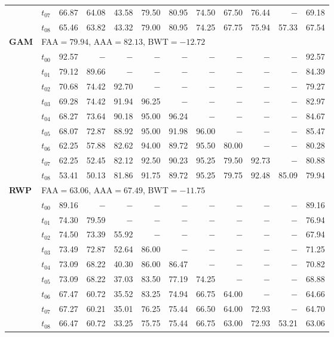 \begin{table}[ht]
\begin{tabular}{@{}l l r r r r r r r r r r@{}}
 & $t_{07}$ & 66.87 & 64.08 & 43.58 & 79.50 & 80.95 & 74.50 & 67.50 & 76.44 & $-$ & 69.18 \\
 & $t_{08}$ & 65.46 & 63.82 & 43.32 & 79.00 & 80.95 & 74.25 & 67.75 & 75.94 & 57.33 & 67.54 \\
\midrule
\multirow{10}{*}{\textbf{GAM}} & \multicolumn{11}{l}{\quad\small FAA$=79.94$,\; AAA$=82.13$,\; BWT$=-12.72$} \\
 & $t_{00}$ & 92.57 & $-$ & $-$ & $-$ & $-$ & $-$ & $-$ & $-$ & $-$ & 92.57 \\
 & $t_{01}$ & 79.12 & 89.66 & $-$ & $-$ & $-$ & $-$ & $-$ & $-$ & $-$ & 84.39 \\
 & $t_{02}$ & 70.68 & 74.42 & 92.70 & $-$ & $-$ & $-$ & $-$ & $-$ & $-$ & 79.27 \\
 & $t_{03}$ & 69.28 & 74.42 & 91.94 & 96.25 & $-$ & $-$ & $-$ & $-$ & $-$ & 82.97 \\
 & $t_{04}$ & 68.27 & 73.64 & 90.18 & 95.00 & 96.24 & $-$ & $-$ & $-$ & $-$ & 84.67 \\
 & $t_{05}$ & 68.07 & 72.87 & 88.92 & 95.00 & 91.98 & 96.00 & $-$ & $-$ & $-$ & 85.47 \\
 & $t_{06}$ & 62.25 & 57.88 & 82.62 & 94.00 & 89.72 & 95.50 & 80.00 & $-$ & $-$ & 80.28 \\
 & $t_{07}$ & 62.25 & 52.45 & 82.12 & 92.50 & 90.23 & 95.25 & 79.50 & 92.73 & $-$ & 80.88 \\
 & $t_{08}$ & 53.41 & 50.13 & 81.86 & 91.75 & 89.72 & 95.25 & 79.75 & 92.48 & 85.09 & 79.94 \\
\midrule
\multirow{10}{*}{\textbf{RWP}} & \multicolumn{11}{l}{\quad\small FAA$=63.06$,\; AAA$=67.49$,\; BWT$=-11.75$} \\
 & $t_{00}$ & 89.16 & $-$ & $-$ & $-$ & $-$ & $-$ & $-$ & $-$ & $-$ & 89.16 \\
 & $t_{01}$ & 74.30 & 79.59 & $-$ & $-$ & $-$ & $-$ & $-$ & $-$ & $-$ & 76.94 \\
 & $t_{02}$ & 74.50 & 73.39 & 55.92 & $-$ & $-$ & $-$ & $-$ & $-$ & $-$ & 67.94 \\
 & $t_{03}$ & 73.49 & 72.87 & 52.64 & 86.00 & $-$ & $-$ & $-$ & $-$ & $-$ & 71.25 \\
 & $t_{04}$ & 73.09 & 68.22 & 40.30 & 86.00 & 86.47 & $-$ & $-$ & $-$ & $-$ & 70.82 \\
 & $t_{05}$ & 73.09 & 68.22 & 37.03 & 83.50 & 77.19 & 74.25 & $-$ & $-$ & $-$ & 68.88 \\
 & $t_{06}$ & 67.47 & 60.72 & 35.52 & 83.25 & 74.94 & 66.75 & 64.00 & $-$ & $-$ & 64.66 \\
 & $t_{07}$ & 67.27 & 60.21 & 35.01 & 76.25 & 75.44 & 66.50 & 64.00 & 72.93 & $-$ & 64.70 \\
 & $t_{08}$ & 66.47 & 60.72 & 33.25 & 75.75 & 75.44 & 66.75 & 63.00 & 72.93 & 53.21 & 63.06 \\
\bottomrule
\end{tabular}
\end{table}
